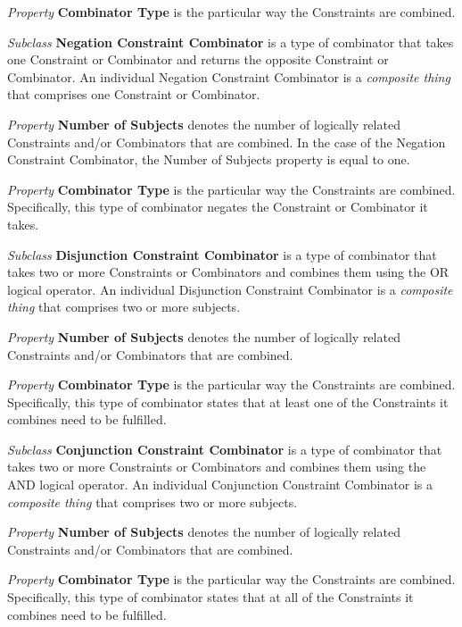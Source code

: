 \begin{description}
\textit{Property} \textbf{Combinator Type} is the particular way the Constraints are combined.


\item\textit{Subclass} \textbf{Negation Constraint Combinator} is a type of combinator that takes one Constraint or Combinator and returns the opposite Constraint or Combinator. An individual Negation Constraint Combinator is a \textit{composite thing} that comprises one Constraint or Combinator.

\textit{Property} \textbf{Number of Subjects} denotes the number of logically related Constraints and/or Combinators that are combined. In the case of the Negation Constraint Combinator, the Number of Subjects property is equal to one.

\textit{Property} \textbf{Combinator Type} is the particular way the Constraints are combined. Specifically, this type of combinator negates the Constraint or Combinator it takes.


\item\textit{Subclass} \textbf{Disjunction Constraint Combinator} is a type of combinator that takes two or more Constraints or Combinators and combines them using the OR logical operator. An individual Disjunction Constraint Combinator is a \textit{composite thing} that comprises two or more subjects.

\textit{Property} \textbf{Number of Subjects} denotes the number of logically related Constraints and/or Combinators that are combined.

\textit{Property} \textbf{Combinator Type} is the particular way the Constraints are combined. Specifically, this type of combinator states that at least one of the Constraints it combines need to be fulfilled.


\item\textit{Subclass} \textbf{Conjunction Constraint Combinator} is a type of combinator that takes two or more Constraints or Combinators and combines them using the AND logical operator. An individual Conjunction Constraint Combinator is a \textit{composite thing} that comprises two or more subjects.

\textit{Property} \textbf{Number of Subjects} denotes the number of logically related Constraints and/or Combinators that are combined.

\textit{Property} \textbf{Combinator Type} is the particular way the Constraints are combined. Specifically, this type of combinator states that at all of the Constraints it combines need to be fulfilled.







\end{description}
